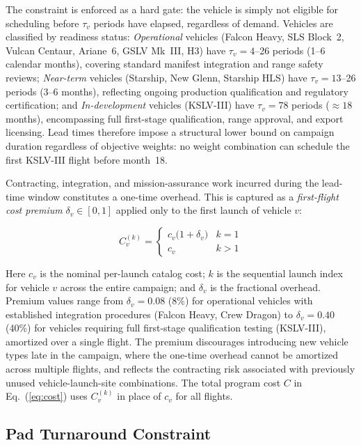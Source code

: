 \noindent The constraint is enforced as a hard gate: the vehicle
is simply not eligible for scheduling before $\tau_v$ periods
have elapsed, regardless of demand.
Vehicles are classified by readiness status:
\emph{Operational} vehicles (Falcon Heavy, SLS Block~2,
Vulcan Centaur, Ariane~6, GSLV Mk~III, H3) have
$\tau_v = 4$--26 periods (1--6 calendar months), covering
standard manifest integration and range safety reviews;
\emph{Near-term} vehicles (Starship, New Glenn, Starship HLS)
have $\tau_v = 13$--26 periods (3--6 months), reflecting ongoing
production qualification and regulatory certification;
and \emph{In-development} vehicles (KSLV-III) have
$\tau_v = 78$ periods ($\approx 18$ months), encompassing full
first-stage qualification, range approval, and export licensing.
Lead times therefore impose a structural lower bound on campaign
duration regardless of objective weights: no weight combination
can schedule the first KSLV-III flight before month~18.

Contracting, integration, and mission-assurance work incurred
during the lead-time window constitutes a one-time overhead.
This is captured as a \emph{first-flight cost premium}
$\delta_v \in [0,1]$ applied only to the first launch of
vehicle $v$:

\begin{equation}
  C_v^{(k)} =
  \begin{cases}
    c_v\bigl(1 + \delta_v\bigr) & k = 1 \\
    c_v                         & k > 1
  \end{cases}
  \label{eq:firstflight}
\end{equation}

\noindent Here $c_v$ is the nominal per-launch catalog cost;
$k$ is the sequential launch index for vehicle $v$ across
the entire campaign; and $\delta_v$ is the fractional overhead.
Premium values range from $\delta_v = 0.08$ (8\%) for
operational vehicles with established integration procedures
(Falcon Heavy, Crew Dragon) to $\delta_v = 0.40$ (40\%) for
vehicles requiring full first-stage qualification testing
(KSLV-III), amortized over a single flight.
The premium discourages introducing new vehicle types late
in the campaign, where the one-time overhead cannot be amortized
across multiple flights, and reflects the contracting risk
associated with previously unused vehicle-launch-site combinations.
The total program cost $C$ in Eq.~(\ref{eq:cost}) uses
$C_v^{(k)}$ in place of $c_v$ for all flights.

\subsection{Pad Turnaround Constraint}

